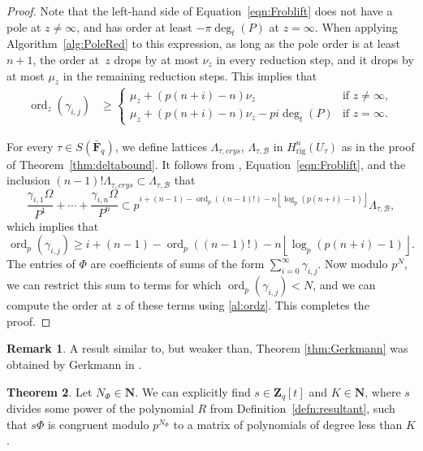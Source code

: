 \documentclass[a4paper,11pt]{article}
\numberwithin{equation}{section}
\providecommand{\floor}[1]{\left\lfloor#1\right\rfloor}   %
\newcommand{\NN}{\mathbf{N}} %
\newcommand{\ZZ}{\mathbf{Z}} %
\newcommand{\FF}{\mathbf{F}} %
\DeclareMathOperator{\ord}{ord}          %
\providecommand{\Hrig}{H_{\text{rig}}}  %
\providecommand{\cB}{\mathcal{B}} %
\theoremstyle{definition}
\newtheorem{thm}{Theorem}[section]
\newtheorem{rem}[thm]{Remark}
\begin{document}
\begin{proof}
Note that the left-hand side of Equation~\eqref{eqn:Froblift} does not have a 
pole at $z \neq \infty$, and has order at least $-\pi\deg_t(P)$ at $z=\infty$. 
When applying Algorithm~\ref{alg:PoleRed} to this expression, as long as the 
pole order is at least~$n+1$, the order at~$z$ drops by at most $\nu_z$ in every 
reduction step, and it drops by at most $\mu_z$ in the remaining reduction steps. 
This implies that
\begin{align} \label{al:ordz}
\ord_z(\gamma_{i,j}) &\geq 
\begin{cases}
\mu_z + (p(n+i)-n) \nu_z                 &\mbox{if } z \neq \infty, \\
\mu_z + (p(n+i)-n) \nu_z - pi \deg_t(P)  &\mbox{if } z=\infty.
\end{cases}
\end{align}

For every $\tau \in S(\bar{\FF}_q)$, we
define lattices $\Lambda_{\tau,crys}$, $\Lambda_{\tau,\cB}$ in $\Hrig^n(U_{\tau})$
as in the proof of Theorem~\ref{thm:deltabound}. It follows from
\citep[Proposition 3.4.6]{AbbottKedlayaRoe2006}, Equation~\eqref{eqn:Froblift}, 
and the inclusion $(n-1)!\Lambda_{\tau,crys} \subset \Lambda_{\tau,\cB}$ that
\begin{equation*}
\frac{\gamma_{i,1} \Omega}{P^1}+\dotsb+\frac{\gamma_{i,n} \Omega}{P^n} \subset 
p^{i+(n-1)-\ord_p((n-1)!)-n \floor{\log_p(p(n+i)-1)}} \Lambda_{\tau,\cB},
\end{equation*}
which implies that
\begin{equation*}
\ord_p(\gamma_{i,j}) \geq i+(n-1) - \ord_p((n-1)!) - n \floor{\log_p(p(n+i)-1)}.
\end{equation*}
The entries of $\Phi$ are coefficients of sums of the form 
$\sum_{i=0}^{\infty} \gamma_{i,j}$. Now modulo $p^N$, we can 
restrict this sum to terms for which $\ord_p(\gamma_{i,j})<N$,
and we can compute the order at $z$ of these terms using
\eqref{al:ordz}. This completes the proof.
\end{proof}

\begin{rem}
A result similar to, but weaker than, Theorem \ref{thm:Gerkmann} 
was obtained by Gerkmann in \citep[Section 6]{Gerkmann2007}.
\end{rem}

\begin{thm} \label{thm:defD}
Let $N_{\Phi} \in \NN$. We can explicitly find $s \in \ZZ_q[t]$ and $K \in \NN$, 
where $s$ divides some power of the polynomial $R$ from Definition~\ref{defn:resultant}, such that 
$s \Phi$ is congruent modulo $p^{N_{\Phi}}$ to a matrix of polynomials of degree 
less than $K$. 
\end{thm}
\end{document}
